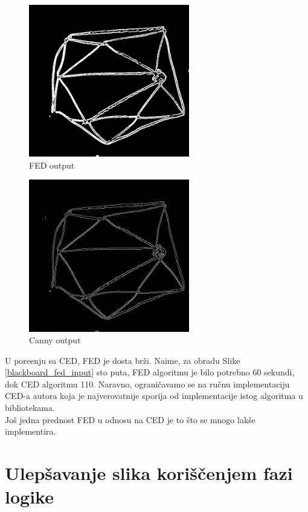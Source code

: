 \documentclass[12pt,a4paper]{article}
\theoremstyle{definition}
\theoremstyle{remark}
\theoremstyle{plain}
\begin{document}
\begin{multicols}{2}
\begin{figure}[H]
\centering
\includegraphics[width=7cm]{images/fuzzy.png}
  \caption{FED output}
\end{figure}

\columnbreak

\begin{figure}[H]
\centering
\includegraphics[width=7cm]{images/canny.png}
  \caption{Canny output}
\end{figure}
\end{multicols}

U pore\dj enju sa CED, FED je dosta br\v zi. Naime, za obradu Slike \ref{blackboard_fed_input} sto puta, FED algoritmu je bilo potrebno 60 sekundi, dok CED algoritmu 110. Naravno, ograni\v cavamo se na ru\v cnu implementaciju CED-a autora koja je najverovatnije sporija od implementacije istog algoritma u bibliotekama.\\

Jo\v s jedna prednost FED u odnosu na CED je to \v sto se mnogo lak\v se implementira.


\section{Ulep\v savanje slika kori\v s\v cenjem fazi logike}
\end{document}
